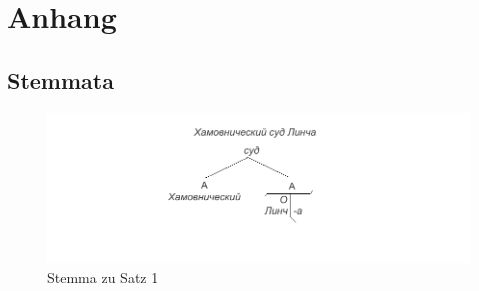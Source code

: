 
\cleardoublepage
{}
\newpage
\abstand
\section*{Anhang}
\label{sec:anhang}

\subsection*{Stemmata}
\label{subsec:anhang:a:stemmata}

\begin{figure}[h]
    \begin{center}
        \includegraphics{anhang_a/stemma1}
        \caption{Stemma zu Satz 1}
        \label{fig:stemma1}
    \end{center}
\end{figure}

